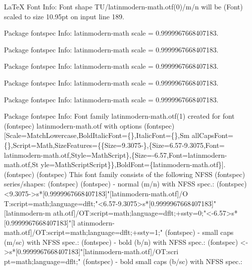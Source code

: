 \documentclass[
  letterpaper,
  DIV=11,
  numbers=noendperiod]{scrartcl}
\newenvironment{Shaded}{\begin{snugshade}}{\end{snugshade}}
\newcommand{\NormalTok}[1]{\textcolor[rgb]{0.00,0.23,0.31}{#1}}
\begin{document}
\begin{Shaded}
\begin{Highlighting}[]
\NormalTok{LaTeX Font Info:    Font shape \textasciigrave{}TU/latinmodern{-}math.otf(0)/m/n\textquotesingle{} will be}
\NormalTok{(Font)              scaled to size 10.95pt on input line 189.}

\NormalTok{Package fontspec Info: latinmodern{-}math scale = 0.9999967668407183.}


\NormalTok{Package fontspec Info: latinmodern{-}math scale = 0.9999967668407183.}


\NormalTok{Package fontspec Info: latinmodern{-}math scale = 0.9999967668407183.}


\NormalTok{Package fontspec Info: latinmodern{-}math scale = 0.9999967668407183.}


\NormalTok{Package fontspec Info: latinmodern{-}math scale = 0.9999967668407183.}


\NormalTok{Package fontspec Info: Font family \textquotesingle{}latinmodern{-}math.otf(1)\textquotesingle{} created for font}
\NormalTok{(fontspec)             \textquotesingle{}latinmodern{-}math.otf\textquotesingle{} with options}
\NormalTok{(fontspec)             [Scale=MatchLowercase,BoldItalicFont=\{\},ItalicFont=\{\},Sm}
\NormalTok{allCapsFont=\{\},Script=Math,SizeFeatures=\{\{Size=9.3075{-}\},\{Size=6.57{-}9.3075,Font=}
\NormalTok{latinmodern{-}math.otf,Style=MathScript\},\{Size={-}6.57,Font=latinmodern{-}math.otf,St}
\NormalTok{yle=MathScriptScript\}\},BoldFont=\{latinmodern{-}math.otf\}].}
\NormalTok{(fontspec)              }
\NormalTok{(fontspec)              This font family consists of the following NFSS}
\NormalTok{(fontspec)             series/shapes:}
\NormalTok{(fontspec)              }
\NormalTok{(fontspec)             {-} \textquotesingle{}normal\textquotesingle{} (m/n) with NFSS spec.:}
\NormalTok{(fontspec)             \textless{}9.3075{-}\textgreater{}s*[0.9999967668407183]"[latinmodern{-}math.otf]/O}
\NormalTok{T:script=math;language=dflt;"\textless{}6.57{-}9.3075\textgreater{}s*[0.9999967668407183]"[latinmodern{-}m}
\NormalTok{ath.otf]/OT:script=math;language=dflt;+ssty=0;"\textless{}{-}6.57\textgreater{}s*[0.9999967668407183]"[l}
\NormalTok{atinmodern{-}math.otf]/OT:script=math;language=dflt;+ssty=1;"}
\NormalTok{(fontspec)             {-} \textquotesingle{}small caps\textquotesingle{}  (m/sc) with NFSS spec.: }
\NormalTok{(fontspec)             {-} \textquotesingle{}bold\textquotesingle{} (b/n) with NFSS spec.:}
\NormalTok{(fontspec)             \textless{}{-}\textgreater{}s*[0.9999967668407183]"[latinmodern{-}math.otf]/OT:scri}
\NormalTok{pt=math;language=dflt;"}
\NormalTok{(fontspec)             {-} \textquotesingle{}bold small caps\textquotesingle{}  (b/sc) with NFSS spec.: }


\end{Highlighting}
\end{Shaded}
\end{document}

